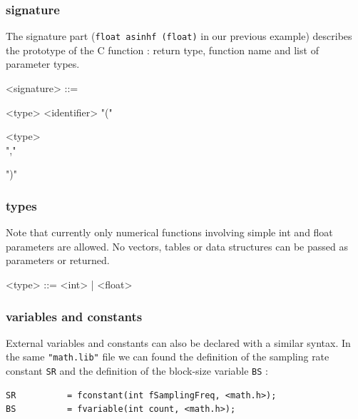 \documentclass[a4paper,10pt]{book}
\begin{document}
\subsubsection{signature} 
The signature part (\lstinline'float asinhf (float)' in our previous example) describes the prototype of the C function : return type, function name and list of parameter types. 

\begin{grammar}
  <signature> ::= 
  \begin{syntdiag}
    <type> <identifier> "("
    \begin{rep}
      <type> \\ ","
    \end{rep}
    ")"
  \end{syntdiag}
\end{grammar}

\subsubsection{types}
Note that currently only numerical functions involving simple int and float parameters are allowed. No vectors, tables or data structures can be passed as parameters or returned.

\begin{grammar}
  <type> ::= 
      <int> | <float>
\end{grammar}


\subsubsection{variables and constants} 
External variables and constants can also be declared with a similar syntax. In the same \lstinline'"math.lib"' file we can found the definition of the sampling rate constant \lstinline'SR' and the definition of the block-size variable \lstinline'BS' :

\begin{lstlisting}
SR 			= fconstant(int fSamplingFreq, <math.h>);
BS          = fvariable(int count, <math.h>);
\end{lstlisting}
\end{document}
